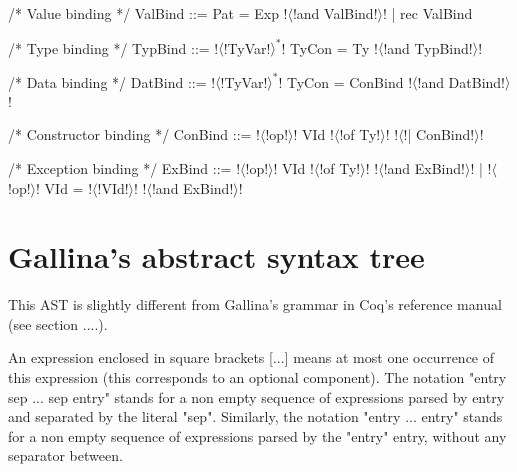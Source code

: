 \documentclass[a4paper,11pt]{article}
\begin{document}
\begin{grm}
/* Value binding */
ValBind ::= Pat = Exp !$\langle$!and ValBind!$\rangle$!
          | rec ValBind

/* Type binding */
TypBind ::= !$\langle$!TyVar!$\rangle^*$!  TyCon = Ty !$\langle$!and TypBind!$\rangle$!

/* Data binding */
DatBind ::= !$\langle$!TyVar!$\rangle^*$!  TyCon = ConBind !$\langle$!and DatBind!$\rangle$!

/* Constructor binding */
ConBind ::= !$\langle$!op!$\rangle$! VId !$\langle$!of Ty!$\rangle$! !$\langle$!| ConBind!$\rangle$!

/* Exception binding */
ExBind ::= !$\langle$!op!$\rangle$! VId !$\langle$!of Ty!$\rangle$! !$\langle$!and ExBind!$\rangle$!
         | !$\langle$!op!$\rangle$! VId = !$\langle$!VId!$\rangle$! !$\langle$!and ExBind!$\rangle$!
\end{grm}

\section{Gallina's abstract syntax tree}

This AST is slightly different from Gallina's grammar in Coq's reference manual
(see section ....).

An expression enclosed in square brackets [...] means at
most one occurrence of this expression (this corresponds to an optional
component). The notation "entry sep ... sep entry" stands for a non empty sequence
of expressions parsed by entry and separated by the literal "sep". Similarly,
the notation "entry ... entry" stands for a non empty sequence of expressions
parsed by the "entry" entry, without any separator between.
\end{document}
